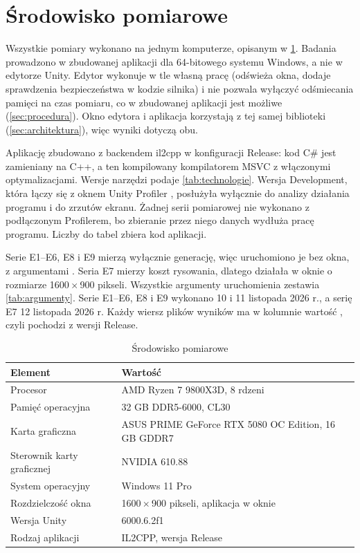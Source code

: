 \section{Środowisko pomiarowe}
\label{sec:srodowisko}

Wszystkie pomiary wykonano na jednym komputerze, opisanym w \cref{tab:sprzet}. Badania prowadzono w zbudowanej aplikacji  dla 64-bitowego systemu Windows, a nie w edytorze Unity. Edytor wykonuje w tle własną pracę (odświeża okna, dodaje sprawdzenia bezpieczeństwa w kodzie silnika) i nie pozwala wyłączyć odśmiecania pamięci na czas pomiaru, co w zbudowanej aplikacji jest możliwe (\cref{sec:procedura}). Okno edytora i aplikacja korzystają z tej samej biblioteki  (\cref{sec:architektura}), więc wyniki dotyczą obu.

Aplikację zbudowano z backendem \ac{il2cpp} \cite{UnityIL2CPP} w konfiguracji Release: kod C\# jest zamieniany na C++, a ten kompilowany kompilatorem MSVC z włączonymi optymalizacjami. Wersje narzędzi podaje \cref{tab:technologie}. Wersja Development, która łączy się z oknem Unity Profiler \cite{UnityProfiler}, posłużyła wyłącznie do analizy działania programu i do zrzutów ekranu. Żadnej serii pomiarowej nie wykonano z podłączonym Profilerem, bo zbieranie przez niego danych wydłuża pracę programu. Liczby do tabel zbiera kod aplikacji.

Serie E1--E6, E8 i E9 mierzą wyłącznie generację, więc uruchomiono je bez okna, z argumentami . Seria E7 mierzy koszt rysowania, dlatego działała w oknie o rozmiarze 1600\,$\times$\,900 pikseli. Wszystkie argumenty uruchomienia zestawia \cref{tab:argumenty}. Serie E1--E6, E8 i E9 wykonano 10 i 11 listopada 2026 r., a serię E7 12 listopada 2026 r. Każdy wiersz plików wyników ma w kolumnie  wartość , czyli pochodzi z wersji Release.

\begin{table}
  \centering
  \footnotesize
  \caption{Środowisko pomiarowe}
  \label{tab:sprzet}
  \begin{tabular}{@{}ll@{}}
    \toprule
    Element & Wartość \\
    \midrule
    Procesor & AMD Ryzen 7 9800X3D, 8 rdzeni \\
    Pamięć operacyjna & 32 GB DDR5-6000, CL30 \\
    Karta graficzna & ASUS PRIME GeForce RTX 5080 OC Edition, 16 GB GDDR7 \\
    Sterownik karty graficznej & NVIDIA 610.88 \\
    System operacyjny & Windows 11 Pro \\
    Rozdzielczość okna & 1600\,$\times$\,900 pikseli, aplikacja w oknie \\
    Wersja Unity & 6000.6.2f1 \\
    Rodzaj aplikacji & IL2CPP, wersja Release \\
    \bottomrule
  \end{tabular}
\end{table}

